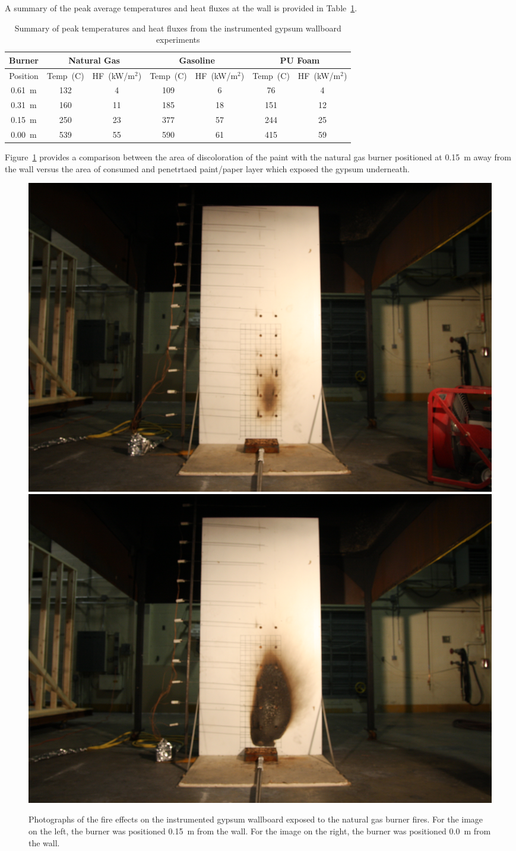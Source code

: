 \documentclass[twoside]{uocthesis}
\begin{document}
A summary of the peak average temperatures and heat fluxes at the wall is provided in Table~\ref{tab:IWGB_Summary}. 

\begin{table}
	\centering
	\footnotesize
	\begin{tabular}{|c|c|c|c|c|c|c|}
		\hline {Burner} & \multicolumn{2}{c}{Natural Gas} & \multicolumn{2}{c}{Gasoline} & \multicolumn{2}{c|}{PU Foam} \\
		\hline  Position & Temp~(C) & HF~(kW/m$^{2}$) & Temp~(C) & HF~(kW/m$^{2}$) & Temp~(C) & HF~(kW/m$^{2}$) 	\\
		\hline \hline 0.61~m & 132 & 4 & 109 & 6 & 76 & 4 \\
		\hline 0.31~m & 160 & 11 & 185 & 18 & 151 & 12	\\
		\hline 0.15~m & 250 & 23 & 377 & 57 & 244 & 25	\\
		\hline 0.00~m & 539 & 55 & 590 & 61 & 415 & 59 	\\
		\hline
	\end{tabular}
	\caption[Summary of instrumented gypsum wallboard experiments]{Summary of peak temperatures and heat fluxes from the instrumented gypsum wallboard experiments}
	\label{tab:IWGB_Summary}
\end{table}






Figure~\ref{IWGB_NG_patterns} provides a comparison between the area of discoloration of the paint with the natural gas burner positioned at 0.15~m away from the wall versus the area of consumed and penetrtaed paint/paper layer which exposed the gypsum underneath.



\begin{figure}[p]
	\centering
	\includegraphics[trim=19.0in 5.0in 19.0in 15.0in, clip=true, width=0.4\columnwidth]{../Figures/IWGB_NG_0_15m}
	\includegraphics[trim=19.0in 5.0in 19.0in 15.0in, clip=true, width=0.4\columnwidth]{../Figures/IWGB_NG_0m} \\
	\caption[Photographs of the fire effects on the instrumented gypsum wallboard exposed to the natural gas burner fires]{Photographs of the fire effects on the instrumented gypsum wallboard exposed to the natural gas burner fires. For the image on the left, the burner was positioned 0.15~m from the wall.  For the image on the right, the burner was positioned 0.0~m from the wall.}
	\label{IWGB_NG_patterns}
\end{figure}
\end{document}
